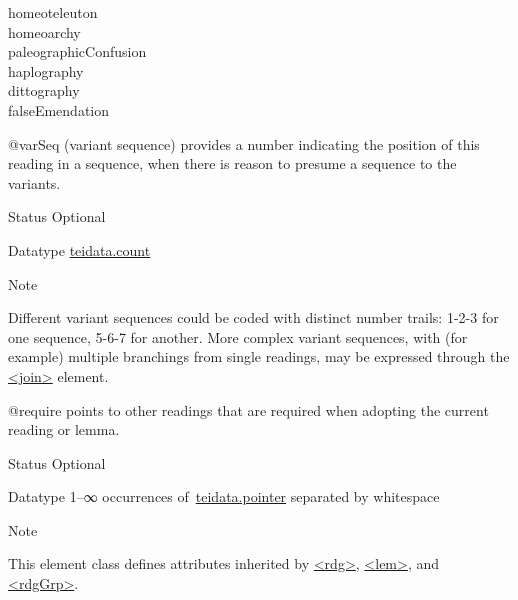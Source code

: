 \begin{reflist}
\begin{sansreflist}
\begin{reflist}
\begin{description}
\item[{homeoteleuton}]
\item[{homeoarchy}]
\item[{paleographicConfusion}]
\item[{haplography}]
\item[{dittography}]
\item[{falseEmendation}]
\end{description} 
\end{reflist}  
    \item[@varSeq]
  (variant sequence) provides a number indicating the position of this reading in a sequence, when there is reason to presume a sequence to the variants. 
\begin{reflist}
    \item[{Status}]
  Optional
    \item[{Datatype}]
  \hyperref[TEI.teidata.count]{teidata.count}
    \item[{Note}]
  \par
Different variant sequences could be coded with distinct number trails: 1-2-3 for one sequence, 5-6-7 for another. More complex variant sequences, with (for example) multiple branchings from single readings, may be expressed through the \hyperref[TEI.join]{<join>} element.
\end{reflist}  
    \item[@require]
  points to other readings that are required when adopting the current reading or lemma.
\begin{reflist}
    \item[{Status}]
  Optional
    \item[{Datatype}]
  1–∞ occurrences of \hyperref[TEI.teidata.pointer]{teidata.pointer} separated by whitespace
\end{reflist}  
\end{sansreflist}  
    \item[{Note}]
  \par
This element class defines attributes inherited by \hyperref[TEI.rdg]{<rdg>}, \hyperref[TEI.lem]{<lem>}, and \hyperref[TEI.rdgGrp]{<rdgGrp>}.
\end{reflist}  
